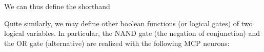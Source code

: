 \documentclass[a4paper,12pt,polish]{jupyterBook}
\begin{document}
\sphinxAtStartPar
We can thus define the short\sphinxhyphen{}hand
\begin{sphinxVerbatimInput}

\begin{sphinxVerbatim}[commandchars=\\\{\}]
   \PYG{p}{[}\PYG{p}{]}\PYG{p}{[}\PYG{p}{]}
\end{sphinxVerbatim}
\end{sphinxVerbatimInput}

\sphinxAtStartPar
Quite similarly, we may define other boolean functions (or logical gates) of two logical variables. In particular, the NAND gate (the negation of conjunction) and the OR gate (alternative) are realized with the following MCP neurons:
\begin{sphinxVerbatimInput}

\begin{sphinxVerbatim}[commandchars=\\\{\}]
   \PYG{p}{[}\PYG{p}{]}\PYG{p}{[}\PYG{p}{]}
     \PYG{p}{[}\PYG{p}{]}\PYG{p}{[}\PYG{p}{]}
\end{sphinxVerbatim}
\end{sphinxVerbatimInput}
\end{document}
